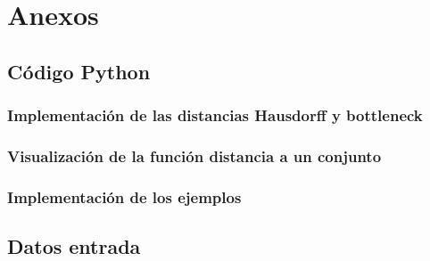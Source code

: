 \chapter*{Anexos}

\section{Código Python}
\subsection{Implementación de las distancias Hausdorff y bottleneck}


\subsection{Visualización de la función distancia a un conjunto}


\subsection{Implementación de los ejemplos}


\section{Datos entrada}
